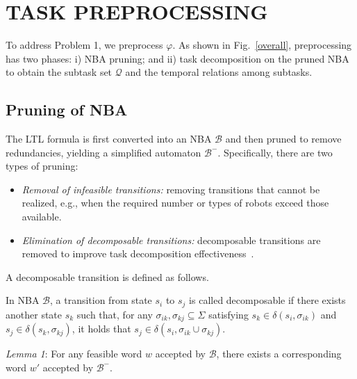 \documentclass[lettersize,journal]{IEEEtran}
\begin{document}
\section{TASK PREPROCESSING}
To address Problem 1, we preprocess $\varphi$. As shown in Fig.~\ref{overall}, preprocessing has two phases: i) NBA pruning; and ii) task decomposition on the pruned NBA to obtain the subtask set $\mathcal{Q}$ and the temporal relations among subtasks.


\subsection{Pruning of NBA}
The LTL formula is first converted into an NBA $\mathcal{B}$ and then pruned to remove redundancies, yielding a simplified automaton $\mathcal{B}^-$. Specifically, there are two types of pruning:
\begin{itemize}
\item \emph{Removal of infeasible transitions:} removing transitions that cannot be realized, e.g., when the required number or types of robots exceed those available.
\item \emph{Elimination of decomposable transitions:} decomposable transitions are removed to improve task decomposition effectiveness~\cite{luo2024decomposition}.
\end{itemize}

A decomposable transition is defined as follows.

\begin{definition}\label{def:decomposable_transition}
In NBA $\mathcal{B}$, a transition from state $s_i$ to $s_j$ is called decomposable if there exists another state $s_k$ such that, for any $\sigma_{ik}, \sigma_{kj} \subseteq \Sigma$ satisfying $s_k \in \delta(s_i,\sigma_{ik})$ and $s_j \in \delta(s_k,\sigma_{kj})$, it holds that $s_j \in \delta(s_i,\sigma_{ik} \cup \sigma_{kj})$.
\end{definition}


\textit{Lemma 1}\label{lem:pruning-preservation}: For any feasible word $w$ accepted by $\mathcal{B}$, there exists a corresponding word $w'$ accepted by $\mathcal{B}^{-}$.
\end{document}
